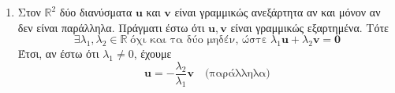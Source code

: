 \begin{examples}
    \begin{enumerate}
        \item Στον $ \mathbb{R}^{2} $ δύο διανύσματα $ \mathbf{u} $ και $ \mathbf{v} $ 
            είναι γραμμικώς ανεξάρτητα αν και μόνον αν δεν είναι παράλληλα. Πράγματι 
            έστω ότι $ \mathbf{u}, \mathbf{v} $ είναι γραμμικώς εξαρτημένα. Τότε 
            \[
                \exists \lambda _{1}, \lambda _{2} \in \mathbb{R} \; 
                \text{όχι και τα δύο μηδέν, ώστε} 
                \; \lambda_{1} \mathbf{u} + \lambda_{2} \mathbf{v} = \mathbf{0} 
            \]
            Έτσι, αν έστω ότι $ \lambda_{1} \neq 0 $, έχουμε 
            \[
                \mathbf{u} = - \frac{\lambda _{2}}{\lambda _{1}} \mathbf{v} \quad  
                \text{(παράλληλα)}
            \] 
    \end{enumerate}
\end{examples}




